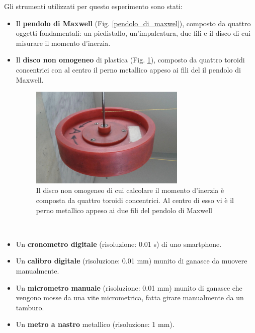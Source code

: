 Gli strumenti utilizzati per questo esperimento sono stati:
\begin{itemize}
    \item Il \textbf{pendolo di Maxwell} (Fig. \ref{pendolo_di_maxwel}), composto da quattro oggetti fondamentali: un piedistallo, un'impalcatura, due fili e il disco di cui misurare il momento d'inerzia.
    \item Il \textbf{disco non omogeneo} di plastica (Fig. \ref{disco}), composto da quattro toroidi concentrici con al centro il perno metallico appeso ai fili del il pendolo di Maxwell.
     \begin{figure}[htbp]
        \centering
        \includegraphics[width=0.70\textwidth]{image/Disco.jpeg}
        \caption[\small Il disco non omogeneo.]{\small Il disco non omogeneo di cui calcolare il momento d'inerzia è composta da quattro toroidi concentrici. Al centro di esso vi è il perno metallico appeso ai due fili del pendolo di Maxwell}
        \label{disco}
    \end{figure}\\
    \item Un \textbf{cronometro digitale} (risoluzione: 0.01 s) di uno smartphone.
    \item Un \textbf{calibro digitale} (risoluzione: 0.01 mm) munito di ganasce da muovere manualmente.
    \item Un \textbf{micrometro manuale} (risoluzione: 0.01 mm) munito di ganasce che vengono mosse da una vite micrometrica, fatta girare manualmente da un tamburo.
    \item Un \textbf{metro a nastro} metallico (risoluzione: 1 mm).
    \begin{figure}[htbp]
        \centering

\end{figure}
\end{itemize}
